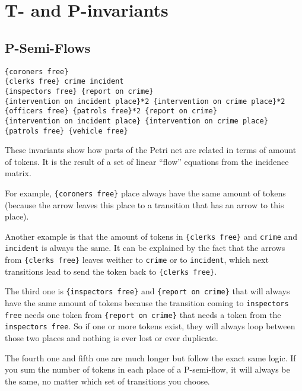 \section{T- and P-invariants}
\label{sec:T- and P-invariants}

\subsection{P-Semi-Flows}

\lstset{
    frame=single,
    breaklines=true
}

\begin{lstlisting}
{coroners free}
{clerks free} crime incident
{inspectors free} {report on crime}
{intervention on incident place}*2 {intervention on crime place}*2 {officers free} {patrols free}*2 {report on crime}
{intervention on incident place} {intervention on crime place} {patrols free} {vehicle free}
\end{lstlisting}

These invariants show how parts of the Petri net are related in terms of amount
of tokens. It is the result of a set of linear \enquote{flow} equations from the
incidence matrix. \newline

For example, \verb#{coroners free}# place always have the same amount of tokens
(because the arrow leaves this place to a transition that has an arrow to this
place). \newline

Another example is that the amount of tokens in \verb#{clerks free}# and
\verb#crime# and \verb#incident# is always the same. It can be explained by the
fact that the arrows from \verb#{clerks free}# leaves weither to \verb#crime#
or to \verb#incident#, which next transitions lead to send the token back to
\verb#{clerks free}#. \newline

The third one is \verb#{inspectors free}# and \verb#{report on crime}# that will always
have the same amount of tokens because the transition coming to
\verb#inspectors free# needs one token from \verb#{report on crime}# that needs a token
from the \verb#inspectors free#. So if one or more tokens exist, they will
always loop between those two places and nothing is ever lost or ever
duplicate. \newline

The fourth one and fifth one are much longer but follow the exact same logic.
If you sum the number of tokens in each place of a P-semi-flow, it will always
be the same, no matter which set of transitions you choose. \newline

